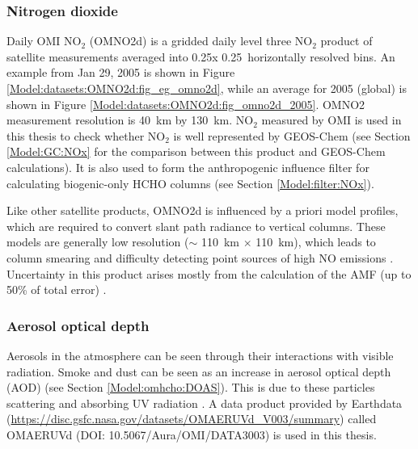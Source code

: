     \subsubsection{Nitrogen dioxide}
      \label{Model:datasets:OMNO2d}
      Daily OMI NO$_2$ (OMNO2d) is a gridded daily level three NO$_2$ product of satellite measurements averaged into 0.25\degr x 0.25\degr ~horizontally resolved bins.
      An example from Jan 29, 2005 is shown in Figure \ref{Model:datasets:OMNO2d:fig_eg_omno2d}, while an average for 2005 (global) is shown in Figure \ref{Model:datasets:OMNO2d:fig_omno2d_2005}.
      OMNO2 measurement resolution is 40~km by 130~km.
      NO$_2$ measured by OMI is used in this thesis to check whether NO$_2$ is well represented by GEOS-Chem (see Section \ref{Model:GC:NOx} for the comparison between this product and GEOS-Chem calculations).
      It is also used to form the anthropogenic influence filter for calculating biogenic-only HCHO columns (see Section \ref{Model:filter:NOx}).
      
      
      
      
      Like other satellite products, OMNO2d is influenced by a priori model profiles, which are required to convert slant path radiance to vertical columns.
      These models are generally low resolution ($\sim$ 110~km $\times$ 110~km), which leads to column smearing and difficulty detecting point sources of high NO emissions \parencite{Goldberg2018}.
      Uncertainty in this product arises mostly from the calculation of the AMF (up to 50\% of total error) \parencite{Lorente2017}.
    
    \subsubsection{Aerosol optical depth}
      \label{Model:datasets:OMAERUVd}
      
      Aerosols in the atmosphere can be seen through their interactions with visible radiation. 
      Smoke and dust can be seen as an increase in aerosol optical depth (AOD) (see Section \ref{Model:omhcho:DOAS}).
      This is due to these particles scattering and absorbing UV radiation \parencite{Ahn2008}.
      A data product provided by Earthdata (\url{https://disc.gsfc.nasa.gov/datasets/OMAERUVd_V003/summary}) called OMAERUVd (DOI: 10.5067/Aura/OMI/DATA3003) is used in this thesis. 
      
